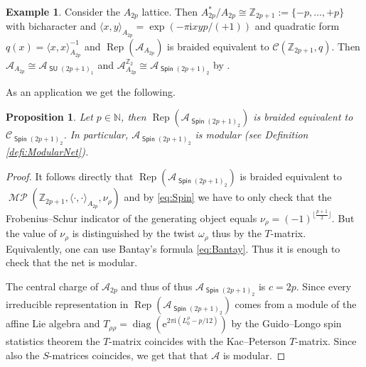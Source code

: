 \documentclass[twoside,11pt,reqno]{amsart}
\newtheorem{prop}[thm]{Proposition}
\theoremstyle{definition}
\newtheorem{example}[thm]{Example}
\theoremstyle{remark}
\newcommand{\Spin}{\mathop{\mathsf{Spin}}}
\newcommand{\SU}{\mathop{\mathsf{SU}}}
\newcommand{\cC}{\mathcal{C}}
\newcommand{\A}{\mathcal{A}}
\newcommand{\ZZ}{\mathbb{Z}}
\newcommand{\NN}{\mathbb{N}}
\DeclareMathOperator{\Rep}{Rep}
\DeclareMathOperator{\diag}{diag}
\newcommand{\e}{\mathrm{e}}
\newcommand{\ima}{\mathrm{i}}
\DeclareMathOperator*{\MP}{\mathcal{MP}}
\newcommand{\umtc}[1]{\cC_{#1}}
\newcommand{\bi}[2]{\langle #1,#2\rangle}
\newcommand{\bislotslot}{\bi\cdot\cdot}
\begin{document}
\begin{example} 
  Consider the $A_{2p}$ lattice. 
  Then $A_{2p}^\ast/A_{2p}\cong \ZZ_{2p+1} :=\{-p,\ldots,+p\}$ with bicharacter
  and $\bi xy_{A_{2p}}=\exp(-\pi \ima xy p/(+1))$ and quadratic form 
  $q(x)=\langle x,x\rangle_{A_{2p}}^{-1}$ and $\Rep(\A_{A_{2p}})$ is 
  braided equivalent to $\cC(\ZZ_{2p+1},q)$.
  Then $\A_{A_{2p}}\cong \A_{\SU(2p+1)_1}$ \cite{St1995,Xu2009,Bi2012} and 
  $\A_{A_{2p}}^{\ZZ_2}\cong \A_{\Spin(2p+1)_2}$ by \cite{Xu2000-2}.
\end{example}
As an application we get the following.
\begin{prop} 
  Let $p\in \NN$, then $\Rep(\A_{\Spin(2p+1)_2})$ is braided equivalent to 
  $\umtc{\Spin(2p+1)_2}$. 
  In particular, $\A_{\Spin(2p+1)_2}$ is modular 
  (see Definition \ref{defi:ModularNet}).
\end{prop}
\begin{proof}
  It follows directly that $\Rep(\A_{\Spin(2p+1)_2})$ is braided equivalent
  to $\MP(\ZZ_{2p+1},\bislotslot_{A_{2p}},\nu_\rho)$ and by \eqref{eq:Spin}
  we have to only check that the Frobenius--Schur indicator of the generating
  object equals $\nu_\rho=(-1)^{\lfloor\frac{p+1}2\rfloor}$.
  But the value of $\nu_\rho$ is distinguished by the twist $\omega_{\rho}$ 
  thus by the $T$-matrix.
  Equivalently, one can use Bantay's formula \eqref{eq:Bantay}. 
  Thus it is enough to check that the net is modular.
  
  The central charge of $\A_{2p}$ and thus of thus $\A_{\Spin(2p+1)_2}$
  is $c=2p$.
  Since every irreducible representation in $\Rep(\A_{\Spin(2p+1)_2})$ comes 
  from a module of the affine Lie algebra and 
  $T_{\rho\rho}=\diag( \e^{2\pi\ima (L^\rho_0-p/12)})$ by the 
  Guido--Longo spin statistics theorem \cite{GuLo1995} the $T$-matrix coincides
  with the Kac--Peterson $T$-matrix.
  Since also the $S$-matrices coincides, we get that that $\A$ is modular.
\end{proof}
\end{document}
